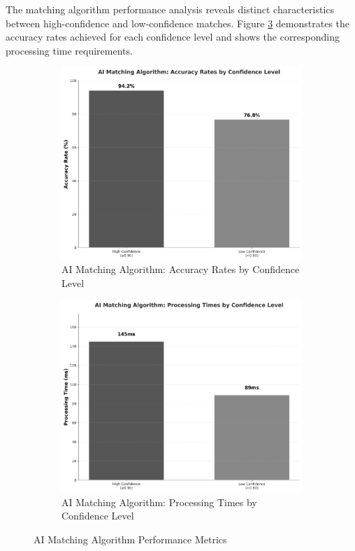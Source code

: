 The matching algorithm performance analysis reveals distinct characteristics between high-confidence and low-confidence matches. Figure \ref{fig:ai_matching_system} demonstrates the accuracy rates achieved for each confidence level and shows the corresponding processing time requirements.

\begin{figure}[htbp]
    \centering
    \begin{subfigure}[t]{0.48\textwidth}
        \centering
        \includegraphics[width=\textwidth]{figs/chapter4/ai_accuracy_rates.png}
        \caption{AI Matching Algorithm: Accuracy Rates by Confidence Level}
        \label{fig:ai_accuracy}
    \end{subfigure}
    \hfill
    \begin{subfigure}[t]{0.48\textwidth}
        \centering
        \includegraphics[width=\textwidth]{figs/chapter4/ai_processing_times.png}
        \caption{AI Matching Algorithm: Processing Times by Confidence Level}
        \label{fig:ai_processing}
    \end{subfigure}
    \caption{AI Matching Algorithm Performance Metrics}
    \label{fig:ai_matching_system}
\end{figure}

